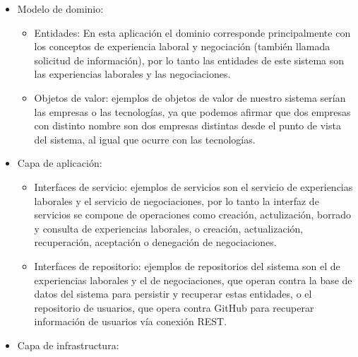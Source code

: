 \documentclass[a4paper, 12pt]{book}
\begin{document}
    \begin{itemize}
        \item Modelo de dominio:

        \begin{itemize}
            \item Entidades: En esta aplicación el dominio corresponde principalmente con los conceptos de experiencia laboral y negociación (también llamada solicitud de información), por lo tanto
            las entidades de este sistema son las experiencias laborales y las negociaciones.
            \item Objetos de valor: ejemplos de objetos de valor de nuestro sistema serían las empresas o las tecnologías, ya que podemos afirmar que dos empresas con distinto nombre son dos empresas distintas desde el punto de vista del sistema, al igual que ocurre con las tecnologías.
        \end{itemize}

        \item Capa de aplicación:

        \begin{itemize}
            \item Interfaces de servicio: ejemplos de servicios son el servicio de experiencias laborales y el servicio de negociaciones, por lo tanto la interfaz de servicios se compone de operaciones como creación, actulización, borrado y consulta de experiencias laborales,
            o creación, actualización, recuperación, aceptación o denegación de negociaciones.
            \item Interfaces de repositorio: ejemplos de repositorios del sistema son el de experiencias laborales y el de negociaciones, que operan contra la base de datos del sistema para persistir y recuperar estas entidades, o el repositorio de usuarios, que opera contra GitHub para recuperar información de usuarios vía conexión REST.
        \end{itemize}


        \item Capa de infrastructura:


\end{itemize}
\end{document}
